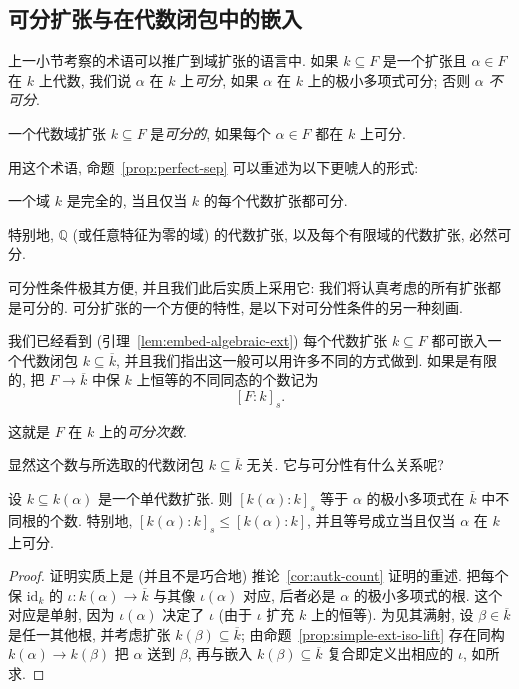 \subsection{可分扩张与在代数闭包中的嵌入}\label{subsec:separable-extensions-embeddings}

上一小节考察的术语可以推广到域扩张的语言中. 如果 $k\subseteq F$ 是一个扩张且 $\alpha\in F$ 在 $k$ 上代数, 我们说 $\alpha$ 在 $k$ 上\emph{可分}, 如果 $\alpha$ 在 $k$ 上的极小多项式可分; 否则 $\alpha$ \emph{不可分}.

\begin{definition}\label{def:separable-extension}
一个代数域扩张 $k\subseteq F$ 是\emph{可分的}, 如果每个 $\alpha\in F$ 都在 $k$ 上可分.
\end{definition}

用这个术语, 命题~\ref{prop:perfect-sep} 可以重述为以下更唬人的形式:

\begin{proposition}\label{prop:perfect-sep-ext}
一个域 $k$ 是完全的, 当且仅当 $k$ 的每个代数扩张都可分.
\end{proposition}

特别地, $\mathbb{Q}$ (或任意特征为零的域) 的代数扩张, 以及每个有限域的代数扩张, 必然可分.

可分性条件极其方便, 并且我们此后实质上采用它: 我们将认真考虑的所有扩张都是可分的. 可分扩张的一个方便的特性, 是以下对可分性条件的另一种刻画.

我们已经看到 (引理~\ref{lem:embed-algebraic-ext}) 每个代数扩张 $k\subseteq F$ 都可嵌入一个代数闭包 $k\subseteq\overline{k}$, 并且我们指出这一般可以用许多不同的方式做到. 如果是有限的, 把 $F\to\overline{k}$ 中保 $k$ 上恒等的不同同态的个数记为
\[
[F:k]_s.
\]

\begin{definition}\label{def:separable-degree}
这就是 $F$ 在 $k$ 上的\emph{可分次数}.
\end{definition}

显然这个数与所选取的代数闭包 $k\subseteq\overline{k}$ 无关. 它与可分性有什么关系呢?

\begin{lemma}\label{lem:simple-sep-degree}
设 $k\subseteq k(\alpha)$ 是一个单代数扩张. 则 $[k(\alpha):k]_s$ 等于 $\alpha$ 的极小多项式在 $\overline{k}$ 中不同根的个数. 特别地, $[k(\alpha):k]_s\leq[k(\alpha):k]$, 并且等号成立当且仅当 $\alpha$ 在 $k$ 上可分.
\end{lemma}

\begin{proof}
证明实质上是 (并且不是巧合地) 推论~\ref{cor:autk-count} 证明的重述. 把每个保 $\mathrm{id}_k$ 的 $\iota:k(\alpha)\to\overline{k}$ 与其像 $\iota(\alpha)$ 对应, 后者必是 $\alpha$ 的极小多项式的根. 这个对应是单射, 因为 $\iota(\alpha)$ 决定了 $\iota$ (由于 $\iota$ 扩充 $k$ 上的恒等). 为见其满射, 设 $\beta\in\overline{k}$ 是任一其他根, 并考虑扩张 $k(\beta)\subseteq\overline{k}$; 由命题~\ref{prop:simple-ext-iso-lift} 存在同构 $k(\alpha)\to k(\beta)$ 把 $\alpha$ 送到 $\beta$, 再与嵌入 $k(\beta)\subseteq\overline{k}$ 复合即定义出相应的 $\iota$, 如所求.
\end{proof}

